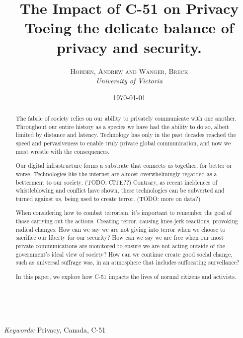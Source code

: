 \documentclass[a4paper, 11pt]{article} %
\title{
    \textbf{The Impact of C-51 on Privacy}\\ %
    Toeing the delicate balance of privacy and security.
} %
\author{\textsc{Hobden, Andrew and Wanger, Breck} %
\\{\textit{University of Victoria}}} %
\date{\today} %
\makeatletter
\renewcommand{\maketitle}{ %
\begin{flushright} %
{\LARGE\@title} %

\vspace{50pt} %

{\large\@author} %
\\\@date %

\vspace{40pt} %
\end{flushright}
}
\makeatother
\begin{document}
\maketitle %



\begin{abstract}
The fabric of society relies on our ability to privately communicate with one another. Throughout our entire history as a species we have had the ability to do so, albeit limited by distance and latency. Technology has only in the past decades reached the speed and pervasiveness to enable truly private global communication, and now we must wrestle with the consequences.

Our digital infrastructure forms a substrate that connects us together, for better or worse. Technologies like the internet are almost overwhelmingly regarded as a betterment to our society. (TODO: CITE??) Contrary, as recent incidences of whistleblowing and conflict have shown, these technologies can be subverted and turned against us, being used to create terror. (TODO: more on data?)

When considering how to combat terrorism, it's important to remember the goal of those carrying out the actions. Creating terror, causing knee-jerk reactions, provoking radical changes. How can we say we are not giving into terror when we choose to sacrifice our liberty for our security? How can we say we are free when our most private communications are monitored to ensure we are not acting outside of the government's ideal view of society? How can we continue create good social change, such as universal suffrage was, in an atmosphere that includes suffocating surveilance?

In this paper, we explore how C-51 impacts the lives of normal citizens and activists.
\end{abstract}

\hspace*{3,6mm}\textit{Keywords:} Privacy, Canada, C-51 %

\vspace{30pt} %
\end{document}
